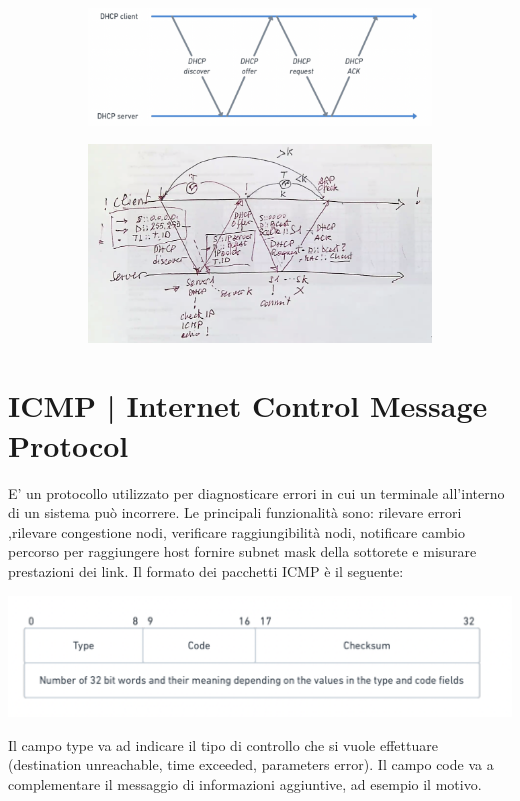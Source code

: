 \documentclass[11pt, oneside]{article}   	%
\begin{document}
\begin{figure}[H]
\begin{subfigure}[h]{0.5\linewidth}
\includegraphics[width=\linewidth]{dhcp}
\end{subfigure}
\hfill
\begin{subfigure}[h]{0.6\linewidth}
\includegraphics[width=\linewidth]{dhcp2}
\end{subfigure}%
\end{figure}

\section*{ICMP | Internet Control Message Protocol}
E' un protocollo utilizzato per diagnosticare errori in cui un terminale all'interno di un sistema può incorrere. Le principali funzionalità sono: rilevare errori ,rilevare congestione nodi, verificare raggiungibilità nodi, notificare cambio percorso per raggiungere host fornire subnet mask della sottorete e misurare prestazioni dei link. Il formato dei pacchetti ICMP è il seguente:
\begin{center}
\includegraphics[scale=0.5]{icmp}
\end{center}
Il campo type va ad indicare il tipo di controllo che si vuole effettuare (destination unreachable, time exceeded, parameters error). Il campo code va a complementare il messaggio di informazioni aggiuntive, ad esempio il motivo.
\end{document}
